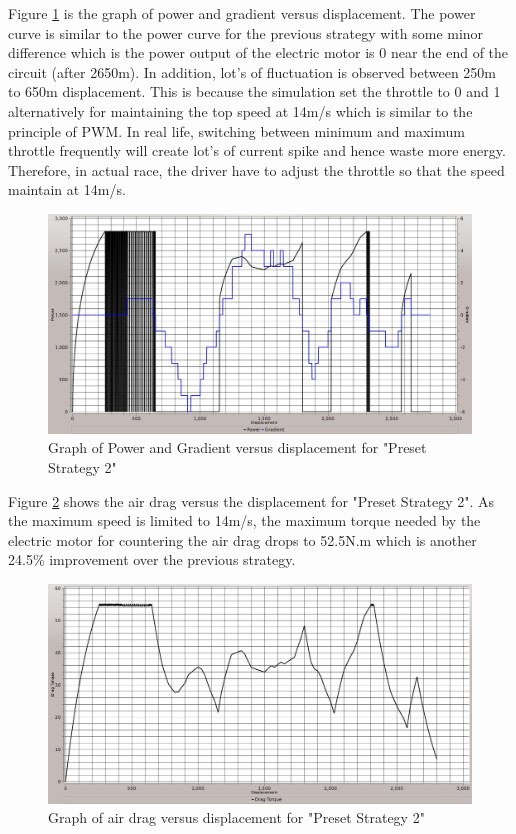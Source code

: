 Figure \ref{im:2_2} is the graph of power and gradient versus displacement. The power curve is similar to the power curve for the previous strategy with some minor difference which is the power output of the electric motor is 0 near the end of the circuit (after 2650m). In addition, lot's of fluctuation is observed between 250m to 650m displacement. This is because the simulation set the throttle to 0 and 1 alternatively for maintaining the top speed at 14m/s which is similar to the principle of PWM. In real life, switching between minimum and maximum throttle frequently will create lot's of current spike and hence waste more energy. Therefore, in actual race, the driver have to adjust the throttle so that the speed maintain at 14m/s. 

\begin{figure}[htb]
	\centering
	\includegraphics[width=6in]{images/2_2.jpg}
	\caption{Graph of Power and Gradient versus displacement for "Preset Strategy 2"}
	\label{im:2_2}
\end{figure}

Figure \ref{im:2_3} shows the air drag versus the displacement for "Preset Strategy 2". As the maximum speed is limited to 14m/s, the maximum torque needed by the electric motor for countering the air drag drops to 52.5N.m which is another 24.5\% improvement over the previous strategy.

\begin{figure}[htb]
	\centering
	\includegraphics[width=6in]{images/2_3.jpg}
	\caption{Graph of air drag versus displacement for "Preset Strategy 2"}
	\label{im:2_3}
\end{figure}


